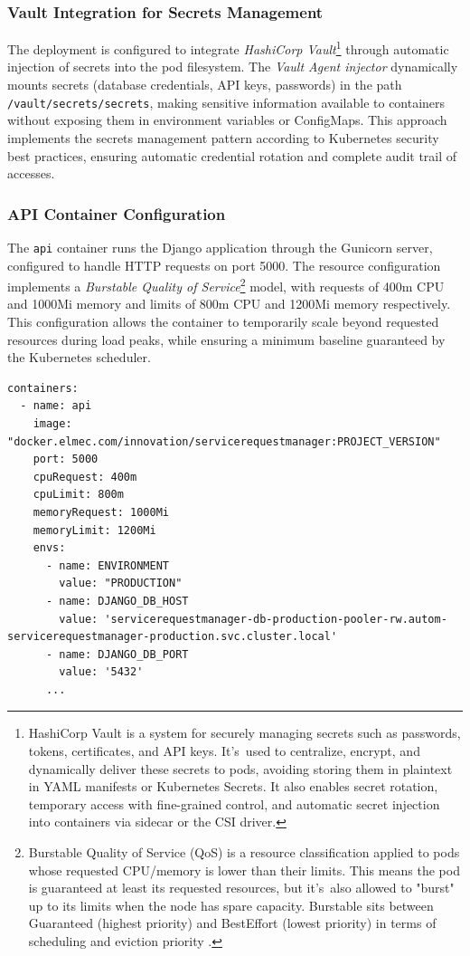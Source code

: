 \subsubsection{Vault Integration for Secrets Management}
The deployment is configured to integrate \textit{HashiCorp Vault}\footnote{HashiCorp Vault is a system for securely managing secrets such as passwords, tokens, certificates, and API keys. It's~used to centralize, encrypt, and dynamically deliver these secrets to pods, avoiding storing them in plaintext in YAML manifests or Kubernetes Secrets. It also enables secret rotation, temporary access with fine-grained control, and automatic secret injection into containers via sidecar or the CSI driver.\cite{vault}} through automatic injection of secrets into the pod filesystem. The \textit{Vault Agent injector} dynamically mounts secrets (database credentials, API keys, passwords) in the path \texttt{/vault/secrets/secrets}, making sensitive information available to containers without exposing them in environment variables or ConfigMaps. This approach implements the secrets management pattern according to Kubernetes security best practices, ensuring automatic credential rotation and complete audit trail of accesses.

\subsubsection{API Container Configuration} \label{sec:api-container-config}
The \texttt{api} container runs the Django application through the Gunicorn server, configured to handle HTTP requests on port 5000. The resource configuration implements a \textit{Burstable Quality of Service}\footnote{Burstable Quality of Service (QoS) is a resource classification applied to pods whose requested CPU/memory is lower than their limits. This means the pod is guaranteed at least its requested resources, but it's~also allowed to "burst" up to its limits when the node has spare capacity. Burstable sits between Guaranteed (highest priority) and BestEffort (lowest priority) in terms of scheduling and eviction priority \cite{burstable_qos}.} model, with requests of 400m CPU and 1000Mi memory and limits of 800m CPU and 1200Mi memory respectively. This configuration allows the container to temporarily scale beyond requested resources during load peaks, while ensuring a minimum baseline guaranteed by the Kubernetes scheduler.

\begin{verbatim}
containers:
  - name: api
    image: "docker.elmec.com/innovation/servicerequestmanager:PROJECT_VERSION"
    port: 5000
    cpuRequest: 400m
    cpuLimit: 800m
    memoryRequest: 1000Mi
    memoryLimit: 1200Mi
    envs:
      - name: ENVIRONMENT
        value: "PRODUCTION"
      - name: DJANGO_DB_HOST
        value: 'servicerequestmanager-db-production-pooler-rw.autom-servicerequestmanager-production.svc.cluster.local'
      - name: DJANGO_DB_PORT
        value: '5432'
      ...
\end{verbatim}

